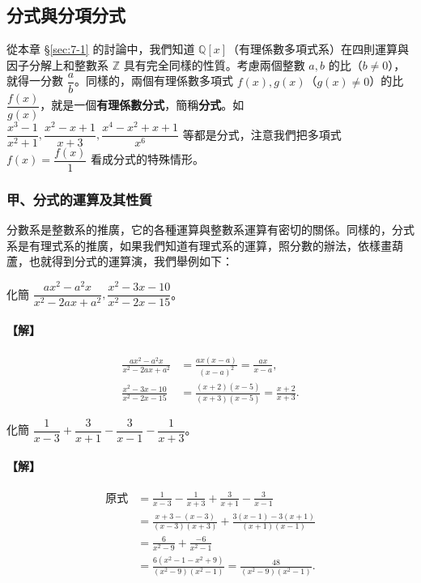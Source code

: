 \subsection{分式與分項分式}\label{sec:7-3}

從本章 \S\ref{sec:7-1} 的討論中，我們知道 $\mathbb{Q}[x]$（有理係數多項式系）在四則運算與因子分解上和整數系 $\mathbb{Z}$ 具有完全同樣的性質。考慮兩個整數 $a, b$ 的比（$b \neq 0$），就得一分數 $\dfrac{a}{b}$。同樣的，兩個有理係數多項式 $f(x), g(x)$（$g(x) \neq 0$）的比 $\dfrac{f(x)}{g(x)}$，就是一個\textbf{有理係數分式}，簡稱\textbf{分式}。如 $\dfrac{x^3-1}{x^2+1}, \dfrac{x^2-x+1}{x+3}, \dfrac{x^4-x^2+x+1}{x^6}$ 等都是分式，注意我們把多項式 $f(x) = \dfrac{f(x)}{1}$ 看成分式的特殊情形。

\subsubsection*{甲、分式的運算及其性質}\label{subsec:7-3-a}

分數系是整數系的推廣，它的各種運算與整數系運算有密切的關係。同樣的，分式系是有理式系的推廣，如果我們知道有理式系的運算，照分數的辦法，依樣畫葫蘆，也就得到分式的運算演，我們舉例如下：

\begin{example}\label{ex:7-3-1}
化簡 $\dfrac{ax^2-a^2 x}{x^2-2ax+a^2}, \dfrac{x^2-3x-10}{x^2-2x-15}$。

\paragraph{【解】}
\begin{align*}
  \frac{ax^2-a^2 x}{x^2-2ax+a^2} &= \frac{ax(x-a)}{(x-a)^2} = \frac{ax}{x-a}, \\
  \frac{x^2-3x-10}{x^2-2x-15} &= \frac{(x+2)(x-5)}{(x+3)(x-5)} = \frac{x+2}{x+3}.
\end{align*}
\end{example}

\begin{example}\label{ex:7-3-2}
化簡 $\dfrac{1}{x-3} + \dfrac{3}{x+1} - \dfrac{3}{x-1} - \dfrac{1}{x+3}$。

\paragraph{【解】}
\begin{align*}
  \text{原式} &= \frac{1}{x-3} - \frac{1}{x+3} + \frac{3}{x+1} - \frac{3}{x-1} \\
  &= \frac{x+3-(x-3)}{(x-3)(x+3)} + \frac{3(x-1)-3(x+1)}{(x+1)(x-1)} \\
  &= \frac{6}{x^2-9} + \frac{-6}{x^2-1} \\
  &= \frac{6(x^2-1-x^2+9)}{(x^2-9)(x^2-1)} = \frac{48}{(x^2-9)(x^2-1)}.
\end{align*}
\end{example}

